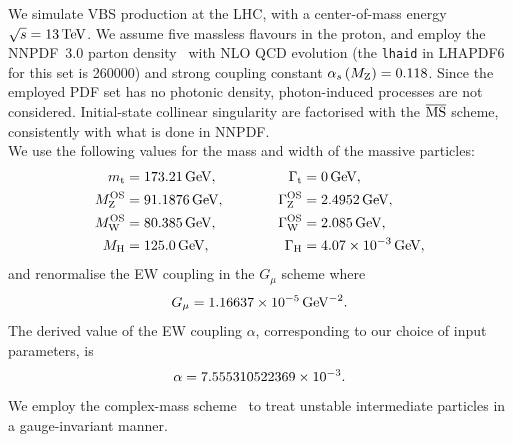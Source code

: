 We simulate VBS production at the LHC, with a center-of-mass energy $\sqrt s = 13 \,\text{TeV}$. We assume five massless flavours in the proton, and employ the NNPDF~3.0 parton 
density~\cite{Ball:2014uwa}
with NLO QCD evolution (the {\tt lhaid} in LHAPDF6~\cite{Buckley:2014ana} for this set is 260000) and strong coupling constant $\alpha_s\left( M_\text{Z} \right) = 0.118$. Since
the employed PDF set has no photonic density, photon-induced processes are not considered. Initial-state collinear singularity are factorised with the  ${\overline{\rm MS}}$ 
scheme, consistently with what is done in NNPDF.\\
We use the following values for the mass and width of the massive particles:
% 
\begin{alignat}{2}
                  m_\text{t}   &=  173.21\,\text{GeV},       & \quad \quad \quad \Gamma_\text{t} &= 0 \,\text{GeV},  \nonumber \\
                M_\text{Z}^\text{OS} &=  91.1876\,\text{GeV},      & \quad \quad \quad \Gamma_\text{Z}^\text{OS} &= 2.4952\,\text{GeV},  \nonumber \\
                M_\text{W}^\text{OS} &=  80.385\,\text{GeV},       & \Gamma_\text{W}^\text{OS} &= 2.085\,\text{GeV},  \nonumber \\
                M_{\rm H} &=  125.0\,\text{GeV},       &  \Gamma_\text{H}   &=  4.07 \times 10^{-3}\,\text{GeV},
\end{alignat}
and renormalise the EW coupling in the $G_\mu$ scheme \cite{Denner:2000bj} where
\begin{equation}
    G_{\mu}    = 1.16637\times 10^{-5}\,\text{GeV}^{-2}.
\end{equation}
The derived value of the EW coupling $\alpha$, corresponding to our choice of input parameters, is 
\begin{equation}
 \alpha = 7.555310522369 \times 10^{-3}. \\
\end{equation}
We employ the complex-mass scheme~\cite{Denner:1999gp,Denner:2005fg} to treat unstable intermediate particles in a gauge-invariant manner.\\

